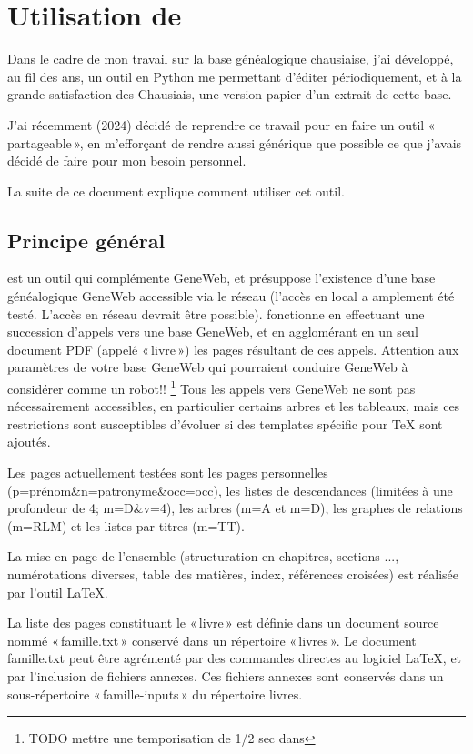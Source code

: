 
\section{Utilisation de \gwtol{}}

Dans le cadre de mon travail sur la base généalogique chausiaise, j'ai développé,
au fil des ans, un outil en Python me permettant d'éditer périodiquement, et
à la grande satisfaction des Chausiais, une version papier d'un extrait de
cette base.

J'ai récemment (2024) décidé de reprendre ce travail pour en faire un outil
«\,partageable\,», en m'efforçant de rendre aussi générique que possible ce que
j'avais décidé de faire pour mon besoin personnel.

La suite de ce document explique comment utiliser cet outil.

\subsection{Principe général}

\gwtol{} est un outil qui complémente GeneWeb, et présuppose l'existence d'une
base généalogique GeneWeb accessible via le réseau (l'accès en local a amplement
été testé. L'accès en réseau devrait être possible).
\gwtol{} fonctionne en effectuant une succession d'appels vers une base GeneWeb,
et en agglomérant en un seul document PDF (appelé «\,livre\,») les pages résultant
de ces appels. Attention aux paramètres de votre base GeneWeb qui pourraient
conduire GeneWeb à considérer \gwtol{} comme un robot!!
\footnote{TODO mettre une temporisation de 1/2 sec dans \gwtol{}}
Tous les appels vers GeneWeb ne sont pas nécessairement accessibles, en
particulier certains arbres et les tableaux, mais ces restrictions sont
susceptibles d'évoluer si des templates spécific pour TeX sont ajoutés.

Les pages actuellement testées sont les pages personnelles
(p=prénom\&n=patronyme\&occ=occ), les listes de descendances (limitées à
une profondeur de 4; m=D\&v=4), les arbres (m=A et m=D), les graphes
de relations (m=RLM) et les listes par titres (m=TT).

La mise en page de l'ensemble (structuration en chapitres, sections ...,
numérotations diverses, table des matières, index, références croisées)
est réalisée par l'outil \LaTeX{}.

La liste des pages constituant le «\,livre\,» est définie dans un document source
nommé «\,famille.txt\,» conservé dans un répertoire «\,livres\,».
Le document famille.txt peut être agrémenté par des commandes directes au
logiciel \LaTeX{}, et par l'inclusion de fichiers annexes. Ces fichiers annexes
sont conservés dans un sous-répertoire «\,famille-inputs\,» du répertoire livres.

